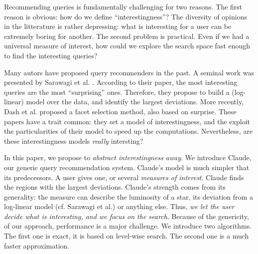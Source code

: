 Recommending queries is fundamentally challenging for two reasons. The first
reason is obvious: how do we define ``interestingness''?  The diversity of
opinions in the litterature is rather depressing:  what is interesting for a
user can be extremely boring for another. The second problem is practical.
Even if we had a universal measure of interest, how could we explore the search
space fast enough to find the interesting queries?

Many autors have proposed query recommenders in the past.  A seminal work was
presented by Sarawagi et al. \cite{sarawagi1998discovery}. According to their
paper, the most interesting queries are the most ``surprising'' ones.
Therefore, they propose to build a (log-linear) model over the data, and
identify the largest deviations. More recently, Dash et
al.\cite{dash2008dynamic} proposed a facet selection method, also based on
surprise. These papers have a trait common: they set a model of
interestingness, and the exploit the particularities of their model to speed up
the computations. Nevertheless, are these interestingness models \emph{really}
intersting?

In this paper, we propose to \emph{abstract interestingness away}. We introduce
Claude, our generic query recommendation system. Claude's model is much simpler
that its predecessors. A user gives one, or several \emph{measures of
interest}. Claude finds the regions with the largest deviations. Claude's
strength comes from its generality: the measure can describe the luminosity of a
star, its deviation from a log-linear model (cf. Sarawagi et al.) or anything
else. Thus, \emph{we let the user decide what is interesting, and we focus on
the search}. Because of the genericity, of our approach, performance is a major
challenge. We introduce two algorithms. The first one is exact, it is based on
level-wise search. The second one is a much faster approximation.
